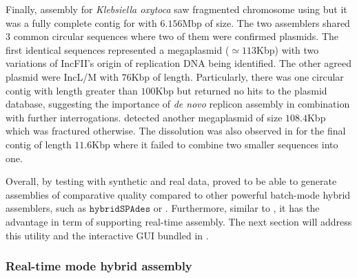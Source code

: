 Finally, assembly for \emph{Klebsiella oxytoca} saw fragmented chromosome using \unicycler{} but it was a fully complete contig for \npgraph{} with $6.156$Mbp of size.
The two assemblers shared 3 common circular sequences where two of them were confirmed plasmids. 
The first identical sequences represented a megaplasmid ($\simeq 113$Kbp) with two variations of IncFII's origin of replication DNA being identified. 
The other agreed plasmid were IncL/M with $76$Kbp of length.
Particularly, there was one circular contig with length greater than $100$Kbp but returned no hits to the plasmid database, suggesting the importance of \emph{de novo} replicon assembly in combination with further interrogations.
\unicycler{} detected another megaplasmid of size $108.4$Kbp which was fractured otherwise. 
The dissolution was also observed in \npgraph{} for the final contig of length $11.6$Kbp where it failed to combine two smaller sequences into one.

Overall, by testing with synthetic and real data, \npgraph{} proved to be able to generate assemblies of comparative quality compared to other powerful batch-mode hybrid assemblers, such as $\mathtt{hybridSPAdes}$ or \unicycler{}.
Furthermore, similar to \npscarf{}, it has the advantage in term of supporting real-time assembly. The next section will address this utility and the interactive GUI bundled in \npgraph{}. 

\subsubsection{Real-time mode hybrid assembly}

